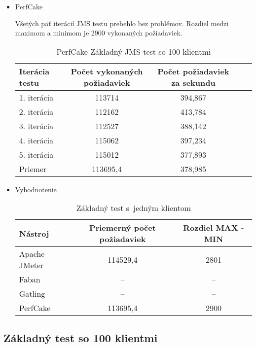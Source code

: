 \documentclass[12pt,oneside,final]{fithesis-utf8}
\begin{document}
\begin{itemize}
\item PerfCake

Všetých päť iterácií JMS testu prebehlo bez problémov. Rozdiel medzi maximom a minimom je 2900 vykonaných požiadaviek.

\begin{table}[H]
\begin{center}
\begin{tabular}{ | l | c | c | c | c |}
		\hline
		 \textbf{Iterácia testu} & \textbf{Počet vykonaných požiadaviek} & \textbf{Počet požiadaviek za sekundu} \\ \hline
		 1. iterácia & 113714 & 394,867 \\ \hline
		 2. iterácia & 112162 & 413,784 \\ \hline
		 3. iterácia & 112527 & 388,142 \\ \hline
		 4. iterácia & 115062 & 397,234 \\ \hline
		 5. iterácia & 115012 & 377,893 \\ \hline
		 Priemer & 113695,4 & 378,985 \\ \hline
		 
\end{tabular}
\end{center}
\caption{PerfCake Základný JMS test so 100 klientmi}
\end{table}

\item Vyhodnotenie

\begin{table}[H]
\begin{center}
\begin{tabular}{ | l | c | c |}
		\hline
		 \textbf{Nástroj} & \textbf{Priemerný počet požiadaviek} & \textbf{Rozdiel MAX - MIN} \\ \hline
		 Apache JMeter & 114529,4 & 2801 \\ \hline
		 Faban & -- & -- \\ \hline
		 Gatling & -- & -- \\ \hline
		 PerfCake & 113695,4 & 2900 \\ \hline
\end{tabular}
\end{center}
\caption{Základný test s~jedným klientom}
\end{table}

\end{itemize}

\subsection{Základný test so 100 klientmi}
\end{document}
